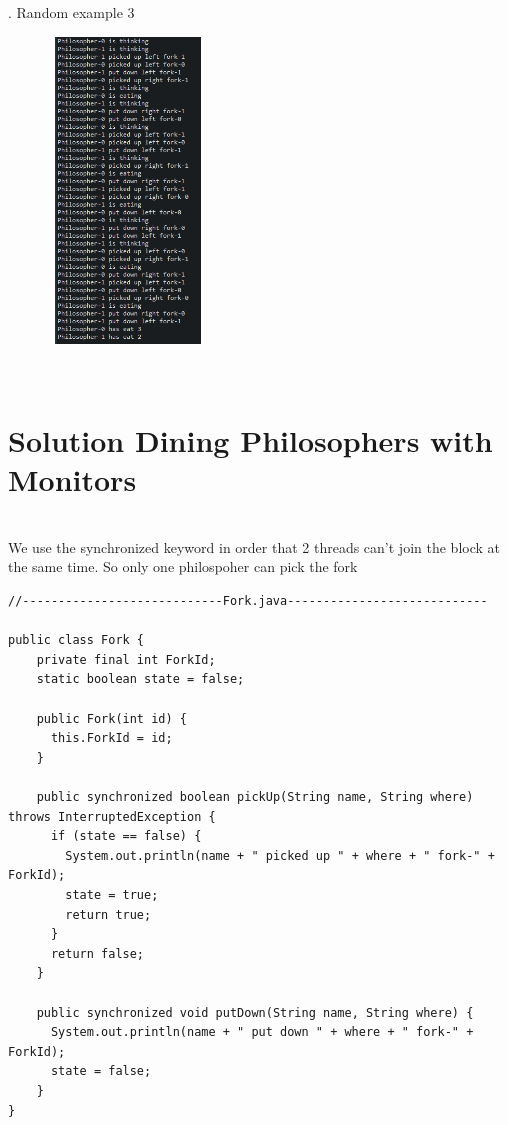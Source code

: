\documentclass[14pt]{article}
\begin{document}
\begin{center}
. Random example 3\\
\vspace{10mm}

\includegraphics[height=3.2in, width = 2.5in]{philosem3.png}\\
\end{center}\\

\section*{Solution Dining Philosophers with Monitors}\\
We use the synchronized keyword in order that 2 threads can't join the block at the same time. So only one philospoher can pick the fork
\begin{lstlisting}
//----------------------------Fork.java----------------------------

public class Fork {
    private final int ForkId;
    static boolean state = false;

    public Fork(int id) {
      this.ForkId = id;
    }

    public synchronized boolean pickUp(String name, String where) throws InterruptedException {
      if (state == false) {
        System.out.println(name + " picked up " + where + " fork-" + ForkId);
        state = true;
        return true;
      }
      return false;
    }

    public synchronized void putDown(String name, String where) {
      System.out.println(name + " put down " + where + " fork-" + ForkId);
      state = false;
    }
}


\end{lstlisting}
\end{document}
